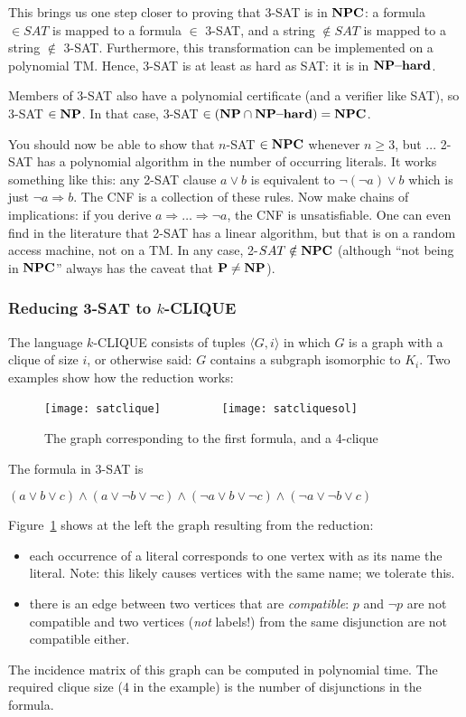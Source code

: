 This brings us one step closer to proving that 3-SAT is in ${\bf NPC}$: a formula $\in SAT$ is mapped to a formula $ \in$ 3-SAT, and a string $\notin SAT$ is mapped to a string $ \notin$ 3-SAT. Furthermore, this transformation can be implemented on a polynomial TM. Hence, 3-SAT is at least as hard as SAT: it is in $\text{\bf NP--hard}$.

Members of 3-SAT also have a polynomial certificate (and a verifier like SAT), so 3-SAT $\in {\bf NP}$. In that case, 3-SAT $\in ({\bf NP} \cap \text{\bf NP--hard}) = {\bf NPC}$.


You should now be able to show that $n$-SAT $\in {\bf NPC}$ whenever $n \geq 3$, but ... 2-SAT has a polynomial algorithm in the number of occurring
literals. It works something like this: any 2-SAT clause $a \vee b$ is equivalent to $\neg(\neg a)\vee b$ which is just $\neg a \Rightarrow b$. The CNF is a collection of these rules. Now make chains of implications: if you derive $a \Rightarrow \hdots \Rightarrow \neg a$, the CNF is unsatisfiable. One can even find in the literature that 2-SAT has a
linear algorithm, but that is on a random access machine, not on a
TM. In any case, 2-$SAT \notin {\bf NPC}$ (although ``not being in ${\bf NPC}$'' always has the caveat that ${\bf P} \neq {\bf NP}$).


\subsubsection{Reducing 3-SAT to $k$-CLIQUE}

The language $k$-CLIQUE consists of tuples $\langle G,i \rangle$
in which $G$ is a graph with a clique of size $i$, or otherwise said:
$G$ contains a subgraph isomorphic to $K_i$. Two examples show how the
reduction works:

\begin{figure}[h]
	\centering
	\texttt{[image: satclique]}
	~~~~~~~~~\texttt{[image: satcliquesol]}
	\caption{The graph corresponding to the first formula, and a
	4-clique}\label{satclique}
\end{figure}

\begin{example}
The formula in 3-SAT is

$(a \vee b \vee c) \wedge (a \vee \neg b \vee \neg c) \wedge (\neg a \vee b \vee \neg c) \wedge (\neg a \vee \neg b \vee c)$

Figure~\ref{satclique} shows at the left the graph resulting from the
reduction:
\begin{itemize}
	\item each occurrence of a literal corresponds to one vertex with as its name the literal. Note: this likely causes vertices with the same name; we tolerate this. 
	\item there is an edge between two vertices that are {\em compatible}: $p$
	and $\neg p$ are not compatible and two vertices (\emph{not} labels!) from the same
	disjunction are not compatible either.
\end{itemize}
The incidence matrix of this graph can be computed in polynomial
time. The required clique size (4 in the example) is the number of
disjunctions in the formula.
\end{example}


